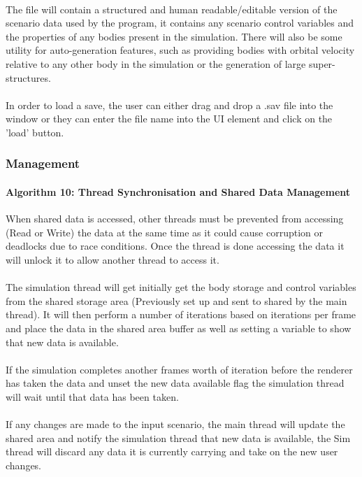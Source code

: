 \paragraph{}
The file will contain a structured and human readable/editable version of the scenario data used by the program, it contains any scenario control variables and the properties of any bodies present in the simulation. There will also be some utility for auto-generation features, such as providing bodies with orbital velocity relative to any other body in the simulation or the generation of large super-structures.

\paragraph{}
In order to load a save, the user can either drag and drop a .sav file into the window or they can enter the file name into the UI element and click on the 'load' button.

\subsubsection{Management}
\paragraph{Algorithm 10: Thread Synchronisation and Shared Data Management}
When shared data is accessed, other threads must be prevented from accessing (Read or Write) the data at the same time as it could cause corruption or deadlocks due to race conditions. Once the thread is done accessing the data it will unlock it to allow another thread to access it.

\paragraph{}
The simulation thread will get initially get the body storage and control variables from the shared storage area (Previously set up and sent to shared by the main thread). It will then perform a number of iterations based on iterations per frame and place the data in the shared area buffer as well as setting a variable to show that new data is available.

\paragraph{}
If the simulation completes another frames worth of iteration before the renderer has taken the data and unset the new data available flag the simulation thread will wait until that data has been taken.

\paragraph{}
If any changes are made to the input scenario, the main thread will update the shared area and notify the simulation thread that new data is available, the Sim thread will discard any data it is currently carrying and take on the new user changes.